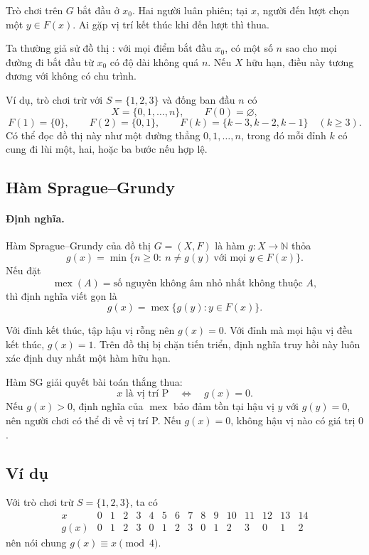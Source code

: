 \documentclass[11pt]{article}
\newcommand{\mex}{\operatorname{mex}}
\begin{document}
Trò chơi trên \(G\) bắt đầu ở \(x_0\). Hai người luân phiên; tại \(x\), người
đến lượt chọn một \(y\in F(x)\). Ai gặp vị trí kết thúc khi đến lượt thì thua.

Ta thường giả sử đồ thị : với mọi điểm bắt đầu
\(x_0\), có một số \(n\) sao cho mọi đường đi bắt đầu từ \(x_0\) có độ dài
không quá \(n\). Nếu \(X\) hữu hạn, điều này tương đương với không có chu trình.

Ví dụ, trò chơi trừ với \(S=\{1,2,3\}\) và đống ban đầu \(n\) có
\[
  X=\{0,1,\ldots,n\},\qquad F(0)=\varnothing,
\]
\[
  F(1)=\{0\},\qquad F(2)=\{0,1\},\qquad
  F(k)=\{k-3,k-2,k-1\}\quad(k\ge3).
\]
Có thể đọc đồ thị này như một đường thẳng
\(0,1,\ldots,n\), trong đó mỗi đỉnh \(k\) có cung đi lùi một, hai, hoặc ba
bước nếu hợp lệ.

\subsection{Hàm Sprague--Grundy}

\paragraph{Định nghĩa.}
Hàm Sprague--Grundy của đồ thị \(G=(X,F)\) là hàm \(g:X\to\mathbb N\) thỏa
\[
  g(x)=\min\{n\ge0:\ n\ne g(y)\ \text{với mọi }y\in F(x)\}.
\]
Nếu đặt
\[
  \mex(A)=\text{số nguyên không âm nhỏ nhất không thuộc }A,
\]
thì định nghĩa viết gọn là
\[
  g(x)=\mex\{g(y):y\in F(x)\}.
\]

Với đỉnh kết thúc, tập hậu vị rỗng nên \(g(x)=0\). Với đỉnh mà mọi hậu vị đều
kết thúc, \(g(x)=1\). Trên đồ thị bị chặn tiến triển, định nghĩa truy hồi này
luôn xác định duy nhất một hàm hữu hạn.

Hàm SG giải quyết bài toán thắng thua:
\[
  x\text{ là vị trí P}\quad\Longleftrightarrow\quad g(x)=0.
\]
Nếu \(g(x)>0\), định nghĩa của \(\mex\) bảo đảm tồn tại hậu vị \(y\) với
\(g(y)=0\), nên người chơi có thể đi về vị trí P. Nếu \(g(x)=0\), không hậu vị
nào có giá trị \(0\).

\subsection{Ví dụ}

Với trò chơi trừ \(S=\{1,2,3\}\), ta có
\[
\begin{array}{c|ccccccccccccccc}
x&0&1&2&3&4&5&6&7&8&9&10&11&12&13&14\\ \hline
g(x)&0&1&2&3&0&1&2&3&0&1&2&3&0&1&2
\end{array}
\]
nên nói chung \(g(x)\equiv x\pmod4\).
\end{document}
